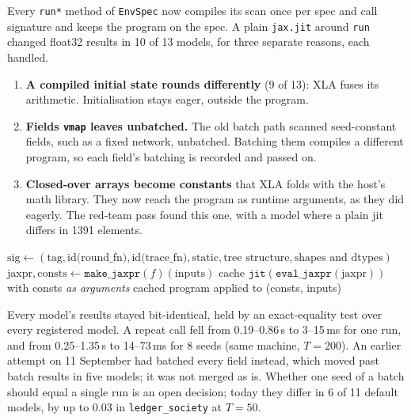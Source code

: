 \documentclass[11pt]{article}
\newcommand{\code}[1]{\texttt{#1}}
\begin{document}
Every \code{run*} method of \code{EnvSpec} now compiles its scan once per spec and
call signature and keeps the program on the spec. A plain \code{jax.jit} around
\code{run} changed float32 results in 10 of 13 models, for three separate reasons,
each handled.

\begin{enumerate}
\item \textbf{A compiled initial state rounds differently} (9 of 13): XLA fuses its
  arithmetic. Initialisation stays eager, outside the program.
\item \textbf{Fields \code{vmap} leaves unbatched.} The old batch path scanned
  seed-constant fields, such as a fixed network, unbatched. Batching them compiles a
  different program, so each field's batching is recorded and passed on.
\item \textbf{Closed-over arrays become constants} that XLA folds with the host's math
  library. They now reach the program as runtime arguments, as they did eagerly. The
  red-team pass found this one, with a model where a plain jit differs in 1391
  elements.
\end{enumerate}

\begin{algorithm}[H]
\caption{\code{EnvSpec.\_compiled}: one program per call signature}
\begin{algorithmic}[1]
\State $\text{sig} \gets (\text{tag}, \text{id(round\_fn)}, \text{id(trace\_fn)}, \text{static}, \text{tree structure}, \text{shapes and dtypes})$ 
  \State $\text{jaxpr}, \text{consts} \gets \code{make\_jaxpr}(f)(\text{inputs})$ 
  \State cache $\code{jit}(\code{eval\_jaxpr}(\text{jaxpr}))$ with consts \emph{as arguments}
\EndIf
\State \Return cached program applied to (consts, inputs)
\end{algorithmic}
\end{algorithm}

\noindent Every model's results stayed bit-identical, held by an exact-equality test
over every registered model. A repeat call fell from 0.19--0.86\,s to 3--15\,ms for one
run, and from 0.25--1.35\,s to 14--73\,ms for 8 seeds (same machine, $T=200$). An
earlier attempt on 11 September had batched every field instead, which moved past
batch results in five models; it was not merged as is. Whether one seed of a batch
should equal a single run is an open decision; today they differ in 6 of 11 default
models, by up to 0.03 in \code{ledger\_society} at $T=50$.
\end{document}
